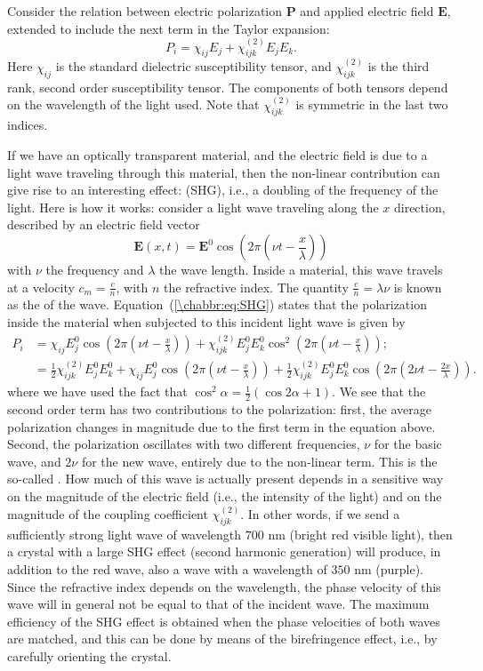 Consider the relation between electric polarization $\mathbf{P}$ and applied electric field $\mathbf{E}$, extended to include the next term in the Taylor expansion:
\begin{equation}
	P_i = \chi_{ij}E_j + \chi^{(2)}_{ijk}E_jE_k.\label{\chabbr:eq:SHG}
\end{equation}
Here $\chi_{ij}$ is the standard dielectric susceptibility tensor, and $\chi^{(2)}_{ijk}$ is the third rank, second order susceptibility tensor. The components of both tensors depend on the wavelength of the light used.  Note that $\chi^{(2)}_{ijk}$ is symmetric in the last two indices.

If we have an optically transparent material, and the electric field is due to a light wave traveling through this material, then the non-linear contribution can give rise to an interesting effect:  (SHG), i.e., a doubling of the frequency of the light.  Here is how it works:  consider a light wave traveling along the $x$ direction, described by an electric field vector
\[
	\mathbf{E}(x,t) = \mathbf{E}^0 \cos(2\pi(\nu t - \frac{x}{\lambda}))
\]
with $\nu$ the frequency and $\lambda$ the wave length.  Inside a material, this wave travels at a velocity $c_m=\frac{c}{n}$, with $n$ the refractive index.  The quantity $\frac{c}{n}=\lambda\nu$ is known as the  of the wave.  Equation~(\ref{\chabbr:eq:SHG}) states that the polarization inside the material when subjected to this incident light wave is given by
\begin{align*}
	P_i &= \chi_{ij}{E}^0_j \cos(2\pi(\nu t - \frac{x}{\lambda}))+\chi^{(2)}_{ijk}
	{E}^0_j{E}^0_k \cos^2(2\pi(\nu t - \frac{x}{\lambda}));\\
	&= \frac{1}{2}\chi^{(2)}_{ijk}{E}^0_j{E}^0_k  +\chi_{ij}{E}^0_j \cos(2\pi(\nu t - \frac{x}{\lambda}))
	+\frac{1}{2}\chi^{(2)}_{ijk}{E}^0_j{E}^0_k\cos(2\pi(2\nu t - \frac{2x}{\lambda})).
\end{align*}
where we have used the fact that $\cos^2\alpha = \frac{1}{2}(\cos 2\alpha+1)$.  We see that the second order term has two contributions to the polarization: first, the average polarization changes in magnitude due to the first term in the equation above.  Second,  the polarization oscillates with two different frequencies, $\nu$ for the basic wave, and $2\nu$ for the new wave, entirely due to the  non-linear term.  This is the so-called .  How much  of this wave is actually present depends in a sensitive way on the magnitude of the electric field (i.e., the intensity of the light) and on the magnitude of the coupling coefficient $\chi^{(2)}_{ijk}$. In other words, if we send a sufficiently strong light wave of wavelength $700$ nm (bright red visible light), then a crystal with a large SHG effect (second harmonic generation) will produce, in addition to the red wave, also a wave with a wavelength of $350$ nm (purple).  Since the refractive index depends on the wavelength, the phase velocity of this wave will in general not be equal to that of the incident wave.  The maximum efficiency of the SHG effect is obtained when the phase velocities of both waves are matched, and this can be done by means of the birefringence effect, i.e., by carefully orienting the crystal.

